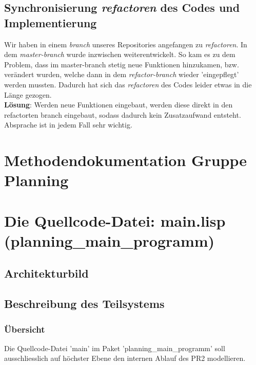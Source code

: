 \documentclass{suturo}
\begin{document}
\subsection{Synchronisierung \textit{refactoren} des Codes und Implementierung}
Wir haben in einem \textit{branch} unseres Repositories angefangen zu \textit{refactoren}. In dem \textit{master-branch} wurde inzwischen weiterentwickelt. So kam es zu dem Problem, dass im master-branch stetig neue Funktionen hinzukamen, bzw. verändert wurden, welche dann in dem \textit{refactor-branch} wieder 'eingepflegt' werden mussten. Dadurch hat sich das \textit{refactoren} des Codes leider etwas in die Länge gezogen.\\
\textbf{Lösung}: Werden neue Funktionen eingebaut, werden diese direkt in den refactorten branch eingebaut, sodass dadurch kein Zusatzaufwand entsteht. Absprache ist in jedem Fall sehr wichtig.

\section*{Methodendokumentation Gruppe Planning}
\section{Die Quellcode-Datei: main.lisp (planning\_main\_programm)}
\subsection{Architekturbild}


\begin{figure}[!htb]
\end{figure}



\subsection{Beschreibung des Teilsystems}
\subsubsection{\"Ubersicht}
Die Quellcode-Datei 'main' im Paket 'planning\_main\_programm' soll ausschliesslich auf höchster Ebene den internen Ablauf des PR2 modellieren. 
\end{document}
